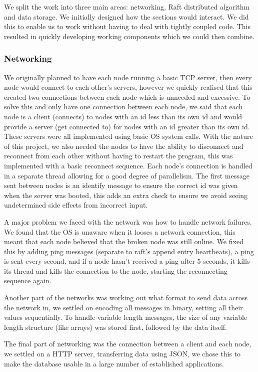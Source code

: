 \documentclass[11pt]{article}
\begin{document}
We split the work into three main areas: networking, Raft distributed algorithm and data storage. We initially designed how the sections would interact. We did this to enable us to work without having to deal with tightly coupled code. This resulted in quickly developing working components which we could then combine.

\subsubsection{Networking}

We originally planned to have each node running a basic TCP server, then every node would connect to each other's servers, however we quickly realised that this created two connections between each node which is unneeded and excessive. To solve this and only have one connection between each node, we said that each node is a client (connects) to nodes with an id less than its own id and would provide a server (get connected to) for nodes with an id greater than its own id. These servers were all implemented using basic OS system calls. With the nature of this project, we also needed the nodes to have the ability to disconnect and reconnect from each other without having to restart the program, this was implemented with a basic reconnect sequence. Each node's connection is handled in a separate thread allowing for a good degree of parallelism. The first message sent between nodes is an identify message to ensure the correct id was given when the server was booted, this adds an extra check to ensure we avoid seeing undetermined side effects from incorrect input.

A major problem we faced with the network was how to handle network failures. We found that the OS is unaware when it looses a network connection, this meant that each node believed that the broken node was still online. We fixed this by adding ping messages (separate to raft's append entry heartbeats), a ping is sent every second, and if a node hasn't received a ping after 5 seconds, it kills its thread and kills the connection to the node, starting the reconnecting sequence again.

Another part of the networks was working out what format to send data across the network in, we settled on encoding all messages in binary, setting all their values sequentially. To handle variable length messages, the size of any variable length structure (like arrays) was stored first, followed by the data itself.

The final part of networking was the connection between a client and each node, we settled on a HTTP server, transferring data using JSON, we chose this to make the database usable in a large number of established applications.
\end{document}
